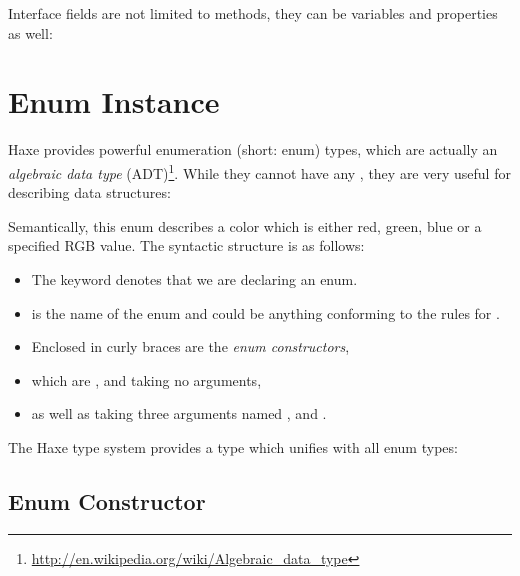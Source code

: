 Interface fields are not limited to methods, they can be variables and properties as well:




\section{Enum Instance}
\label{types-enum-instance}

Haxe provides powerful enumeration (short: enum) types, which are actually an \emph{algebraic data type} (ADT)\footnote{\url{http://en.wikipedia.org/wiki/Algebraic_data_type}}. While they cannot have any , they are very useful for describing data structures:

Semantically, this enum describes a color which is either red, green, blue or a specified RGB value. The syntactic structure is as follows:
\begin{itemize}
	\item The keyword  denotes that we are declaring an enum.
	\item {} is the name of the enum and could be anything conforming to the rules for .
	\item Enclosed in curly braces \expr{$\left\{\right\}$} are the \emph{enum constructors},
	\item which are ,  and  taking no arguments,
	\item as well as  taking three  arguments named ,  and .
\end{itemize}
The Haxe type system provides a type which unifies with all enum types:


\subsection{Enum Constructor}
\label{types-enum-constructor}

